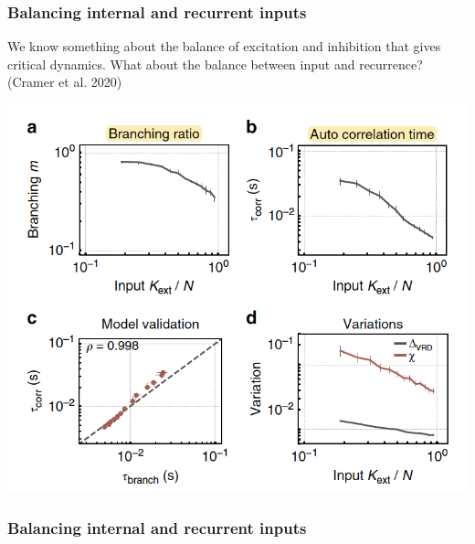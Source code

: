 \documentclass{beamer}
\begin{document}
\begin{frame}[plain]
\frametitle{Balancing internal and recurrent inputs} 

We know something about the balance of excitation and inhibition that gives critical dynamics. What about the balance between input and recurrence? (Cramer et al. 2020)


\begin{center}
\includegraphics[scale=0.55]{cramer-criticality}
\end{center}

\end{frame}

\begin{frame}[plain]
\frametitle{Balancing internal and recurrent inputs} 
\end{frame}
\end{document}
